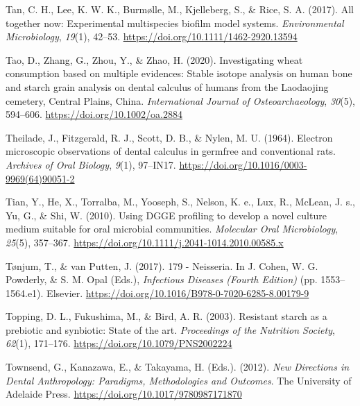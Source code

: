 \documentclass[
  letterpaper,
]{book}
\newlength{\cslhangindent}
\newlength{\cslentryspacingunit} %
\newenvironment{CSLReferences}[2] %
 {%
  \setlength{\parindent}{0pt}
  \ifodd #1
  \let\oldpar\par
  \def\par{\hangindent=\cslhangindent\oldpar}
  \fi
  \setlength{\parskip}{#2\cslentryspacingunit}
 }%
 {}
\begin{document}
\begin{CSLReferences}{1}{0}
\leavevmode{}%
Tan, C. H., Lee, K. W. K., Burmølle, M., Kjelleberg, S., \& Rice, S. A.
(2017). All together now: Experimental multispecies biofilm model
systems. \emph{Environmental Microbiology}, \emph{19}(1), 42--53.
\url{https://doi.org/10.1111/1462-2920.13594}

\leavevmode{}%
Tao, D., Zhang, G., Zhou, Y., \& Zhao, H. (2020). Investigating wheat
consumption based on multiple evidences: {Stable} isotope analysis on
human bone and starch grain analysis on dental calculus of humans from
the {Laodaojing} cemetery, {Central Plains}, {China}.
\emph{International Journal of Osteoarchaeology}, \emph{30}(5),
594--606. \url{https://doi.org/10.1002/oa.2884}

\leavevmode{}%
Theilade, J., Fitzgerald, R. J., Scott, D. B., \& Nylen, M. U. (1964).
Electron microscopic observations of dental calculus in germfree and
conventional rats. \emph{Archives of Oral Biology}, \emph{9}(1),
97--IN17. \url{https://doi.org/10.1016/0003-9969(64)90051-2}

\leavevmode{}%
Tian, Y., He, X., Torralba, M., Yooseph, S., Nelson, K. e., Lux, R.,
McLean, J. s., Yu, G., \& Shi, W. (2010). Using {DGGE} profiling to
develop a novel culture medium suitable for oral microbial communities.
\emph{Molecular Oral Microbiology}, \emph{25}(5), 357--367.
\url{https://doi.org/10.1111/j.2041-1014.2010.00585.x}

\leavevmode{}%
Tønjum, T., \& van Putten, J. (2017). 179 - {Neisseria}. In J. Cohen, W.
G. Powderly, \& S. M. Opal (Eds.), \emph{Infectious {Diseases} ({Fourth
Edition})} (pp. 1553--1564.e1). {Elsevier}.
\url{https://doi.org/10.1016/B978-0-7020-6285-8.00179-9}

\leavevmode{}%
Topping, D. L., Fukushima, M., \& Bird, A. R. (2003). Resistant starch
as a prebiotic and synbiotic: State of the art. \emph{Proceedings of the
Nutrition Society}, \emph{62}(1), 171--176.
\url{https://doi.org/10.1079/PNS2002224}

\leavevmode{}%
Townsend, G., Kanazawa, E., \& Takayama, H. (Eds.). (2012). \emph{New
{Directions} in {Dental Anthropology}: {Paradigms}, {Methodologies} and
{Outcomes}}. {The University of Adelaide Press}.
\url{https://doi.org/10.1017/9780987171870}


\end{CSLReferences}
\end{document}
